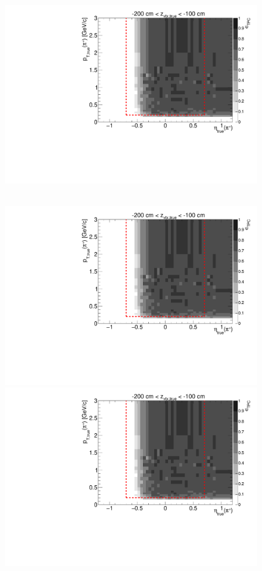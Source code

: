 \begin{figure}[hb]
{  \includegraphics[width=\linewidth,page=17]{graphics/eff/Eff2D_TPC_pion_Plus.pdf}
}~
\parbox{0.495\textwidth}{
  \centering
  \includegraphics[width=\linewidth,page=12]{graphics/eff/Eff2D_TPC_pion_Plus.pdf}\\
  \includegraphics[width=\linewidth,page=14]{graphics/eff/Eff2D_TPC_pion_Plus.pdf}\\
}
\end{figure}

